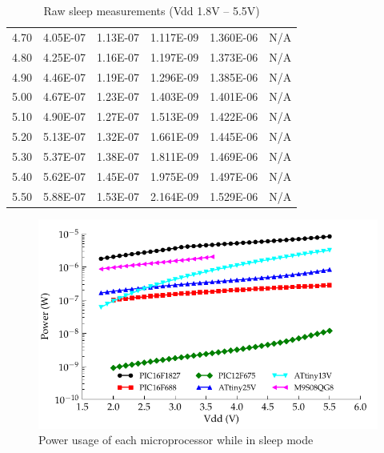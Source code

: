 \begin{table}[htp]
\begin{centering}
\begin{tabular}{|r|r|r|r|r|r|}
4.70  & 4.05E-07  & 1.13E-07  & 1.117E-09  & 1.360E-06  & N/A \tabularnewline
4.80  & 4.25E-07  & 1.16E-07  & 1.197E-09  & 1.373E-06  & N/A \tabularnewline
4.90  & 4.46E-07  & 1.19E-07  & 1.296E-09  & 1.385E-06  & N/A \tabularnewline
5.00  & 4.67E-07  & 1.23E-07  & 1.403E-09  & 1.401E-06  & N/A \tabularnewline
5.10  & 4.90E-07  & 1.27E-07  & 1.513E-09  & 1.422E-06  & N/A \tabularnewline
5.20  & 5.13E-07  & 1.32E-07  & 1.661E-09  & 1.445E-06  & N/A \tabularnewline
5.30  & 5.37E-07  & 1.38E-07  & 1.811E-09  & 1.469E-06  & N/A \tabularnewline
5.40  & 5.62E-07  & 1.45E-07  & 1.975E-09  & 1.497E-06  & N/A \tabularnewline
5.50  & 5.88E-07  & 1.53E-07  & 2.164E-09  & 1.529E-06  & N/A \tabularnewline
\hline
\end{tabular}
\par\end{centering}

\protect\caption{Raw sleep measurements (Vdd 1.8V -- 5.5V)}
\end{table}
\begin{figure}
\begin{centering}
\includegraphics{content/appendices/microprocessorPowerMeasurements/graphics/Graph_All_Sleeping_Power}
\par\end{centering}

\protect\caption{\label{fig:All_SleepPower}Power usage of each microprocessor while
in sleep mode}


\end{figure}



